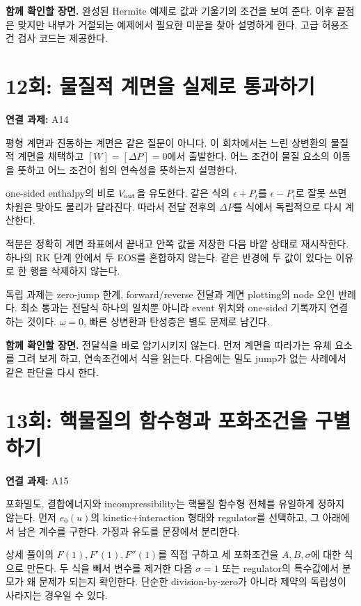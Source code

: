 \documentclass[
  10pt,
  a4paper,
]{article}
\begin{document}
\textbf{함께 확인할 장면.} 완성된 Hermite 예제로 값과 기울기의 조건을
보여 준다. 이후 끝점은 맞지만 내부가 거절되는 예제에서 필요한 미분을
찾아 설명하게 한다. 고급 허용조건 검사 코드는 제공한다.

\section{12회: 물질적 계면을 실제로
통과하기}\label{uxd68c-uxbb3cuxc9c8uxc801-uxacc4uxba74uxc744-uxc2e4uxc81cuxb85c-uxd1b5uxacfcuxd558uxae30}

\textbf{연결 과제:} A14

평형 계면과 진동하는 계면은 같은 질문이 아니다. 이 회차에서는 느린
상변환의 물질적 계면을 채택하고 \([W]=[\Delta P]=0\)에서 출발한다. 어느
조건이 물질 요소의 이동을 뜻하고 어느 조건이 힘의 연속성을 뜻하는지
설명한다.

one-sided enthalpy의 비로 \(V_{\rm out}\)을 유도한다. 같은 식의
\(\epsilon+P_t\)를 \(\epsilon-P_t\)로 잘못 쓰면 차원은 맞아도 물리가
달라진다. 따라서 전달 전후의 \(\Delta P\)를 식에서 독립적으로 다시
계산한다.

적분은 정확히 계면 좌표에서 끝내고 안쪽 값을 저장한 다음 바깥 상태로
재시작한다. 하나의 RK 단계 안에서 두 EOS를 혼합하지 않는다. 같은 반경에
두 값이 있다는 이유로 한 행을 삭제하지 않는다.

독립 과제는 zero-jump 한계, forward/reverse 전달과 계면 plotting의 node
오인 반례다. 최소 통과는 전달식 하나의 일치뿐 아니라 event 위치와
one-sided 기록까지 연결하는 것이다. \(\omega=0\), 빠른 상변환과 탄성층은
별도 문제로 남긴다.

\textbf{함께 확인할 장면.} 전달식을 바로 암기시키지 않는다. 먼저 계면을
따라가는 유체 요소를 그려 보게 하고, 연속조건에서 식을 읽는다. 다음에는
밀도 jump가 없는 사례에서 같은 판단을 다시 한다.

\section{13회: 핵물질의 함수형과 포화조건을
구별하기}\label{uxd68c-uxd575uxbb3cuxc9c8uxc758-uxd568uxc218uxd615uxacfc-uxd3ecuxd654uxc870uxac74uxc744-uxad6cuxbcc4uxd558uxae30}

\textbf{연결 과제:} A15

포화밀도, 결합에너지와 incompressibility는 핵물질 함수형 전체를 유일하게
정하지 않는다. 먼저 \(e_0(u)\)의 kinetic+interaction 형태와 regulator를
선택하고, 그 아래에서 남은 계수를 구한다. 가정과 유도를 문장에서
분리한다.

상세 풀이의 \(F(1),F'(1),F''(1)\)를 직접 구하고 세 포화조건을
\(A,B,\sigma\)에 대한 식으로 만든다. 두 식을 빼서 변수를 제거한 다음
\(\sigma=1\) 또는 regulator의 특수값에서 분모가 왜 문제가 되는지
확인한다. 단순한 division-by-zero가 아니라 제약의 독립성이 사라지는
경우일 수 있다.
\end{document}
